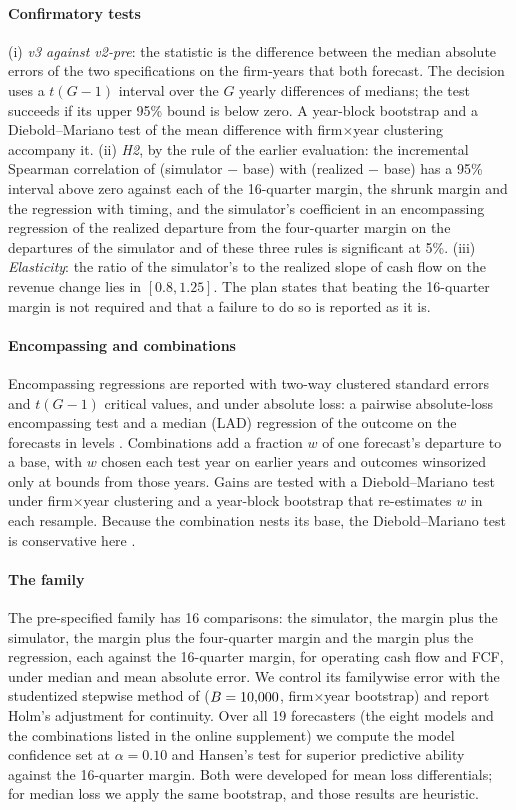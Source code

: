 \documentclass[preprint,12pt,authoryear]{elsarticle}
\begin{document}
\paragraph{Confirmatory tests} (i) \emph{v3 against v2-pre}: the statistic is the difference between the median absolute errors of the two specifications on the firm-years that both forecast. The decision uses a $t(G-1)$ interval over the $G$ yearly differences of medians; the test succeeds if its upper 95\% bound is below zero. A year-block bootstrap and a Diebold--Mariano test of the mean difference with firm$\times$year clustering accompany it. (ii) \emph{H2}, by the rule of the earlier evaluation: the incremental Spearman correlation of (simulator $-$ base) with (realized $-$ base) has a 95\% interval above zero against each of the 16-quarter margin, the shrunk margin and the regression with timing, and the simulator's coefficient in an encompassing regression of the realized departure from the four-quarter margin on the departures of the simulator and of these three rules is significant at 5\%. (iii) \emph{Elasticity}: the ratio of the simulator's to the realized slope of cash flow on the revenue change lies in $[0.8, 1.25]$. The plan states that beating the 16-quarter margin is not required and that a failure to do so is reported as it is.

\paragraph{Encompassing and combinations} Encompassing regressions are reported with two-way clustered standard errors and $t(G-1)$ critical values, and under absolute loss: a pairwise absolute-loss encompassing test and a median (LAD) regression of the outcome on the forecasts in levels \citep{fair1990}. Combinations add a fraction $w$ of one forecast's departure to a base, with $w$ chosen each test year on earlier years and outcomes winsorized only at bounds from those years. Gains are tested with a Diebold--Mariano test under firm$\times$year clustering and a year-block bootstrap that re-estimates $w$ in each resample. Because the combination nests its base, the Diebold--Mariano test is conservative here \citep{clark2001}.

\paragraph{The family} The pre-specified family has 16 comparisons: the simulator, the margin plus the simulator, the margin plus the four-quarter margin and the margin plus the regression, each against the 16-quarter margin, for operating cash flow and FCF, under median and mean absolute error. We control its familywise error with the studentized stepwise method of \citet{romano2005} ($B=10{,}000$, firm$\times$year bootstrap) and report Holm's adjustment for continuity. Over all 19 forecasters (the eight models and the combinations listed in the online supplement) we compute the model confidence set at $\alpha=0.10$ \citep{hansen2011} and Hansen's test for superior predictive ability against the 16-quarter margin. Both were developed for mean loss differentials; for median loss we apply the same bootstrap, and those results are heuristic.
\end{document}

